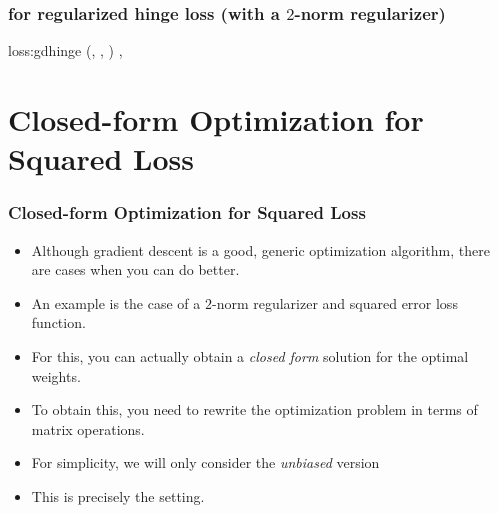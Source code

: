 \documentclass[trans]{beamer}
\begin{document}
\begin{frame}
  \frametitle{ for regularized hinge loss (with a
$2$-norm regularizer)}
\newalgorithm%
  {loss:gdhinge}%
  {(, \VAR{$\la$}, )}
  {
\ENDIF
\ENDFOR
\SETST{$\vg$}{$\VARm{\vg} - \VARm{\la} \VARm{\vw}$}
\SETST{$\vw$}{$\VARm{\vw} + \VARm{\eta} \VARm{\vg}$}
\ENDFOR
\RETURN \VAR{$\vw$}, 
}
\end{frame}
\section{Closed-form Optimization for Squared Loss}
\label{sec:loss:reg}

\begin{frame}
  \frametitle{Closed-form Optimization for Squared Loss}
\begin{itemize}
\item 
Although gradient descent is a good, generic optimization algorithm,
there are cases when you can do better. 
\item An example is the case of a
$2$-norm regularizer and squared error loss function.
\item  For this, you
can actually obtain a \emph{closed form} solution for the optimal
weights. 
\item To obtain this, you need to rewrite the
optimization problem in terms of matrix operations. 
\item  For simplicity,
we will only consider the \emph{unbiased} version
\item
This is precisely the 
setting.
\end{itemize}
\end{frame}
\end{document}
